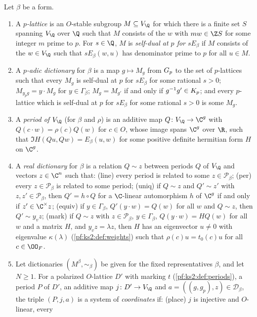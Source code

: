 \begin{definition}\label{pf:ks2:def:coord}
Let $\beta$ be a form.
\begin{enumerate}
\item A \emph{$p$-lattice} is an $O$-stable subgroup $M\subseteq V_\Q$ for which there is a finite set
  $S$ spanning $V_\Q$ over $\Q$ such that $M$ consists of the $w$ with $mw\in\Z S$ for some integer
  $m$ prime to $p$. For $s\in\Q$, $M$ is \emph{self-dual at $p$ for $sE_\beta$} if $M$ consists of the
  $w\in V_\Q$ such that $sE_\beta(w,u)$ has denominator prime to $p$ for all $u\in M$.
\item A \emph{$p$-adic dictionary} for $\beta$ is a map $g\mapsto M_g$ from $G_{p}$ to the set of
  $p$-lattices such that every $M_g$ is self-dual at $p$ for $sE_\beta$ for some rational $s>0$;
  $M_{y_pg}=y\cdot M_g$ for $y\in\Gamma_\beta$; $M_g=M_{g'}$ if and only if $g^{-1}g'\in K_{p}$; and
  every $p$-lattice which is self-dual at $p$ for $sE_\beta$ for some rational $s>0$ is some $M_g$.
\item A \emph{period of $V_\Q$} (for $\beta$ and $\rho$) is an additive map $Q\colon V_\Q\to\C^g$ with
  $Q(c\cdot w)=\rho(c)Q(w)$ for $c\in O$, whose image spans $\C^g$ over $\R$, such that
  $\Im H(Qu,Qw)=E_\beta(u,w)$ for some positive definite hermitian form $H$ on $\C^g$.
\item A \emph{real dictionary} for $\beta$ is a relation $Q\sim z$ between periods $Q$ of $V_\Q$ and
  vectors $z\in\C^n$ such that: (line) every period is related to some $z\in\mathcal P_\beta$; (per)
  every $z\in\mathcal P_\beta$ is related to some period; (uniq) if $Q\sim z$ and $Q'\sim z'$ with
  $z,z'\in\mathcal P_\beta$, then $Q'=h\circ Q$ for a $\C$-linear automorphism $h$ of $\C^g$ if and
  only if $z'\in\C^\times z$; (equiv) if $y\in\Gamma_\beta$, $Q'(y\cdot w)=Q(w)$ for all $w$ and
  $Q\sim z$, then $Q'\sim y_vz$; (mark) if $Q\sim z$ with $z\in\mathcal P_\beta$, $y\in\Gamma_\beta$,
  $Q(y\cdot w)=HQ(w)$ for all $w$ and a matrix $H$, and $y_vz=\lambda z$, then $H$ has an eigenvector
  $u\ne0$ with eigenvalue $\kappa(\lambda)$ (\cref{pf:ks2:def:weights}) such that $\rho(c)u=t_0(c)u$
  for all $c\in\kstwoOF$.
\item Let dictionaries $(M^\beta,\sim_\beta)$ be given for the fixed representatives $\beta$, and let
  $N\ge1$. For a polarized $O$-lattice $D'$ with marking $t$ (\cref{pf:ks2:def:periods}), a period $P$
  of $D'$, an additive map $j\colon D'\to V_\Q$ and $a=((g,g_p),z)\in\mathcal D_\beta$, the triple
  $(P,j,a)$ is a system of \emph{coordinates} if: (place) $j$ is injective and $O$-linear, every

\end{enumerate}
\end{definition}
